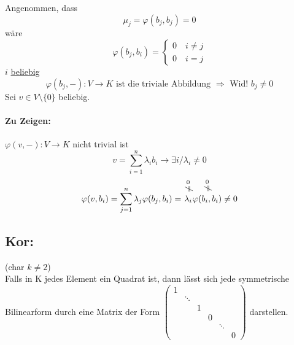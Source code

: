 \documentclass[titlepage,12pt,a4paper,ngerman]{report}
\newcommand{\tx}[1]{\textrm{#1}}
\newcommand{\summ}[2]{\sum_{#1}^{#2}}
\begin{document}
\boxed{\Rightarrow} Angenommen, dass 
$$\mu_j = \varphi(b_j,b_j) = 0$$
wäre
$$\varphi(b_j,b_i) = \left \{ \begin{array}{ll}
0 \quad i \neq j\\
0 \quad i   =  j
\end{array} \right. $$
$i$ \underline{beliebig}
$$\varphi(b_j,-):V \to K \tx{ ist die triviale Abbildung } \Rightarrow \tx{ Wid! } b_j \neq 0$$
\boxed{\Leftarrow} Sei $v \in V\setminus \{0\}$ beliebig.
\paragraph{Zu Zeigen:} $\varphi (v,-): V \to K$ nicht trivial ist
$$v = \summ{i=1}{n} \lambda_i b_i \rightarrow \exists i / \lambda_i \neq 0$$
$$\varphi(v,b_i) = \summ{j=1}{n} \lambda_j \varphi (b_j, b_i) = \overset{\scriptstyle\underset{\mkern4mu\rotatebox{90}{$\,\neq$}}{0}}{\lambda_i} \overset{\scriptstyle\underset{\mkern4mu\rotatebox{90}{$\,\neq$}}{0}}{\varphi(b_i,b_i)} \neq 0$$


\subsection{Kor:}
(char $ k \neq 2 $)\\
Falls in K jedes Element ein Quadrat ist, dann lässt sich jede symmetrische Bilinearform durch eine Matrix der Form
$ \begin{pmatrix}
1 \\
& \ddots \\
& & 1 \\
& & & 0 \\
& & & & \ddots \\
& & & & & 0
\end{pmatrix} $ darstellen.
\end{document}
